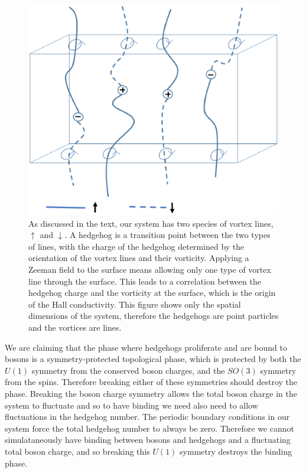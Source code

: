 \documentclass[prb,twocolumn]{revtex4-1}
\begin{document}
\begin{figure}
\includegraphics[angle=-90,width=0.95\linewidth]{figures/monopoles.eps}
\caption{As discussed in the text, our system has two species of vortex lines, $\uparrow$ and $\downarrow$. A hedgehog is a transition point between the two types of lines, with the charge of the hedgehog determined by the orientation of the vortex lines and their vorticity. Applying a Zeeman field to the surface means allowing only one type of vortex line through the surface. This leads to a correlation between the hedgehog charge and the vorticity at the surface, which is the origin of the Hall conductivity. This figure shows only the spatial dimensions of the system, therefore the hedgehogs are point particles and the vortices are lines.}
\label{monopoles}
\end{figure}

We are claiming that the phase where hedgehogs proliferate and are bound to bosons is a symmetry-protected topological phase, which is protected by both the $U(1)$ symmetry from the conserved boson charges, and the $SO(3)$ symmetry from the spins. Therefore breaking either of these symmetries should destroy the phase. Breaking the boson charge symmetry allows the total boson charge in the system to fluctuate and so to have binding we need also need to allow fluctuations in the hedgehog number. The periodic boundary conditions in our system force the total hedgehog number to always be zero. Therefore we cannot simulataneously have binding between bosons and hedgehogs and a fluctuating total boson charge, and so breaking this $U(1)$ symmetry destroys the binding phase.
\end{document}
